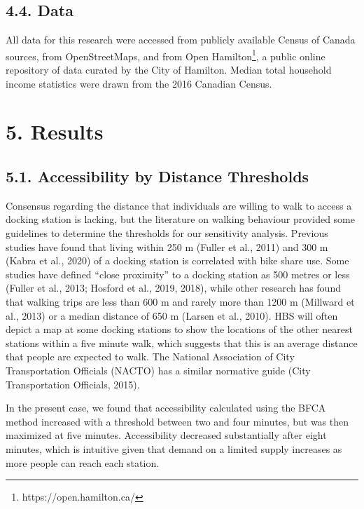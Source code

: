 \documentclass[]{elsarticle} %
\begin{document}
\hypertarget{data}{%
\subsection{4.4. Data}\label{data}}

All data for this research were accessed from publicly available Census
of Canada sources, from OpenStreetMaps, and from Open
Hamilton\footnote{https://open.hamilton.ca/}, a public online repository
of data curated by the City of Hamilton. Median total household income
statistics were drawn from the 2016 Canadian Census.

\hypertarget{results}{%
\section{5. Results}\label{results}}

\hypertarget{accessibility-by-distance-thresholds}{%
\subsection{5.1. Accessibility by Distance
Thresholds}\label{accessibility-by-distance-thresholds}}

Consensus regarding the distance that individuals are willing to walk to
access a docking station is lacking, but the literature on walking
behaviour provided some guidelines to determine the thresholds for our
sensitivity analysis. Previous studies have found that living within 250
m (Fuller et al., 2011) and 300 m (Kabra et al., 2020) of a docking
station is correlated with bike share use. Some studies have defined
``close proximity'' to a docking station as 500 metres or less (Fuller
et al., 2013; Hosford et al., 2019, 2018), while other research has
found that walking trips are less than 600 m and rarely more than 1200 m
(Millward et al., 2013) or a median distance of 650 m (Larsen et al.,
2010). HBS will often depict a map at some docking stations to show the
locations of the other nearest stations within a five minute walk, which
suggests that this is an average distance that people are expected to
walk. The National Association of City Transportation Officials (NACTO)
has a similar normative guide (City Transportation Officials, 2015).

In the present case, we found that accessibility calculated using the
BFCA method increased with a threshold between two and four minutes, but
was then maximized at five minutes. Accessibility decreased
substantially after eight minutes, which is intuitive given that demand
on a limited supply increases as more people can reach each station.
\end{document}

